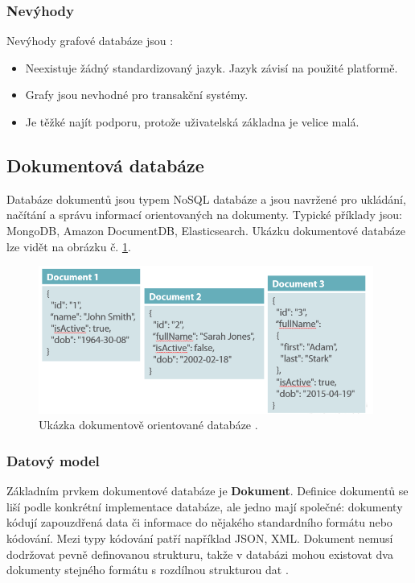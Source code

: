 \subsubsection{Nevýhody}
Nevýhody grafové databáze jsou \cite{advantages_graph}:
\begin{itemize}
\item Neexistuje žádný standardizovaný jazyk. Jazyk závisí na použité platformě.
\item Grafy jsou nevhodné pro transakční systémy.
\item Je těžké najít podporu, protože uživatelská základna je velice malá.
\end{itemize}

\subsection{Dokumentová databáze}
Databáze dokumentů jsou typem NoSQL databáze a  jsou navržené pro ukládání, načítání a správu informací orientovaných na dokumenty. Typické příklady jsou: MongoDB, Amazon DocumentDB, Elasticsearch. Ukázku dokumentové databáze lze vidět na obrázku č. \ref{fig:db_img_document}.
	\begin{figure}[H]
	\centering
	\includegraphics[width=11cm]{img/databaze/document_db}
	\caption{Ukázka dokumentově orientované databáze \cite{relat_vs_nosql}.}
	\label{fig:db_img_document}
	\end{figure}
\subsubsection{Datový model}
Základním prvkem dokumentové databáze je \textbf{Dokument}. Definice dokumentů se liší podle konkrétní implementace databáze, ale jedno mají společné: dokumenty kódují zapouzdřená data či informace do nějakého standardního formátu nebo kódování. Mezi typy kódování patří například \gls{JSON}, \gls{XML}. Dokument nemusí dodržovat pevně definovanou strukturu, takže v databázi mohou existovat dva dokumenty stejného formátu s rozdílnou strukturou dat \cite{data_model_document}.


